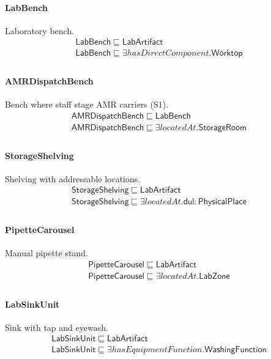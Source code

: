 \documentclass[10pt]{article}
\begin{document}
\paragraph{LabBench} Laboratory bench.
\[\begin{array}{l}
\mathsf{LabBench} \sqsubseteq  \mathsf{LabArtifact} \\
\mathsf{LabBench} \sqsubseteq  \exists \mathit{hasDirectComponent}.\mathsf{Worktop} \\
\end{array}\]
\paragraph{AMRDispatchBench} Bench where staff stage AMR carriers (S1).
\[\begin{array}{l}
\mathsf{AMRDispatchBench} \sqsubseteq  \mathsf{LabBench} \\
\mathsf{AMRDispatchBench} \sqsubseteq  \exists \mathit{locatedAt}.\mathsf{StorageRoom} \\
\end{array}\]
\paragraph{StorageShelving} Shelving with addressable locations.
\[\begin{array}{l}
\mathsf{StorageShelving} \sqsubseteq  \mathsf{LabArtifact} \\
\mathsf{StorageShelving} \sqsubseteq  \exists \mathit{locatedAt}.\mathsf{dul{:}PhysicalPlace} \\
\end{array}\]
\paragraph{PipetteCarousel} Manual pipette stand.
\[\begin{array}{l}
\mathsf{PipetteCarousel} \sqsubseteq  \mathsf{LabArtifact} \\
\mathsf{PipetteCarousel} \sqsubseteq  \exists \mathit{locatedAt}.\mathsf{LabZone} \\
\end{array}\]
\paragraph{LabSinkUnit} Sink with tap and eyewash.
\[\begin{array}{l}
\mathsf{LabSinkUnit} \sqsubseteq  \mathsf{LabArtifact} \\
\mathsf{LabSinkUnit} \sqsubseteq  \exists \mathit{hasEquipmentFunction}.\mathsf{WashingFunction} \\
\end{array}\]
\end{document}

